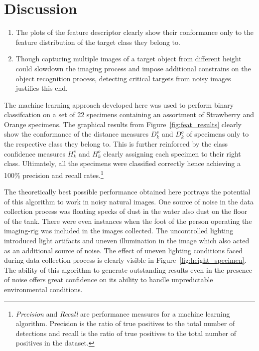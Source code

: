 \documentclass {udthesis}
\begin{document}
\section{Discussion}
\begin{enumerate}
	\item The plots of the feature descriptor clearly show their conformance only to the feature distribution of the target class they belong to.
	
	\item Though capturing multiple images of a target object from different height could slowdown the imaging process and impose additional constrains on the object recognition process, detecting critical targets from noisy images justifies this end.
\end{enumerate}

The machine learning approach developed here was used to perform binary classifcation on a set of 22 specimens containing an assortment of Strawberry and Orange specimens. The graphical results from Figure~\ref{fig:feat_results} clearly show the conformance of the distance measures $D^s_k$ and $D^o_k$ of specimens only to the respective class they belong to. This is further reinforced by the class confidence measures $H^s_k$ and $H^o_k$ clearly assigning each specimen to their right class. Ultimately, all the specimens were classified correctly hence achieving a 100\% precision and recall rates.\footnote{\label{1} \emph{Precision} and \emph{Recall} are performance measures for a machine learning algorithm. Precision is the ratio of true positives to the total number of detections and recall is the ratio of true positives to the total number of positives in the dataset.} 

The theoretically best possible performance obtained here portrays the potential of this algorithm to work in noisy natural images. One source of noise in the data collection process was floating specks of dust in the water also dust on the floor of the tank. There were even instances when the foot of the person operating the imaging-rig was included in the images collected. The uncontrolled lighting introduced light artifacts and uneven illumination in the image which also acted as an additional source of noise. The effect of uneven lighting conditions faced during data collection process is clearly visible in Figure~\ref{fig:height_specimen}. The ability of this algorithm to generate outstanding results even in the presence of noise offers great confidence on its ability to handle unpredictable environmental conditions.
\end{document}

